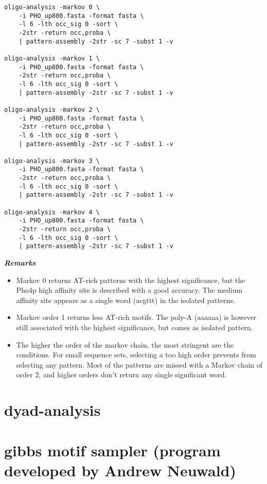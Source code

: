 \begin{verbatim}
oligo-analysis -markov 0 \
    -i PHO_up800.fasta -format fasta \
    -l 6 -lth occ_sig 0 -sort \
    -2str -return occ,proba \
    | pattern-assembly -2str -sc 7 -subst 1 -v

oligo-analysis -markov 1 \
    -i PHO_up800.fasta -format fasta \
    -2str -return occ,proba \
    -l 6 -lth occ_sig 0 -sort \
    | pattern-assembly -2str -sc 7 -subst 1 -v
	
oligo-analysis -markov 2 \
    -i PHO_up800.fasta -format fasta \
    -2str -return occ,proba \
    -l 6 -lth occ_sig 0 -sort \
    | pattern-assembly -2str -sc 7 -subst 1 -v
	
oligo-analysis -markov 3 \
    -i PHO_up800.fasta -format fasta \
    -2str -return occ,proba \
    -l 6 -lth occ_sig 0 -sort \
    | pattern-assembly -2str -sc 7 -subst 1 -v
	
oligo-analysis -markov 4 \
    -i PHO_up800.fasta -format fasta \
    -2str -return occ,proba \
    -l 6 -lth occ_sig 0 -sort \
    | pattern-assembly -2str -sc 7 -subst 1 -v
\end{verbatim}

\textit{\textbf{Remarks}}
\begin{itemize}
\item 
Markov 0 returns AT-rich patterns with the highest significance, but
the Pho4p high affinity site is described with a good accuracy. The
medium affinity site appears as a single word (acgttt) in the isolated
patterns.
\item 
Markov order 1 returns less AT-rich motifs. The poly-A (aaaaaa) is
however still associated with the highest significance, but comes as
isolated pattern.
\item 
The higher the order of the markov chain, the most stringent are the
conditions. For small sequence sets, selecting a too high order
prevents from selecting any pattern. Most of the patterns are missed
with a Markov chain of order 2, and higher orders don't return any
single significant word.
\end{itemize}

\section{dyad-analysis}



\section{gibbs motif sampler (program developed by Andrew Neuwald)}




